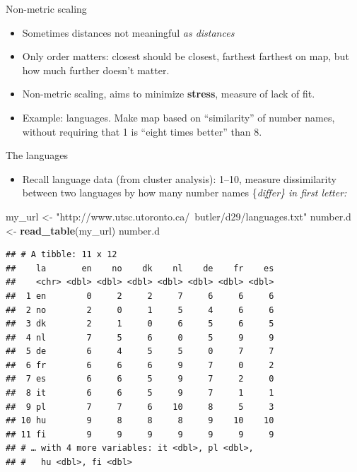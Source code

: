 \documentclass[ignorenonframetext,]{beamer}
\newenvironment{Shaded}{\begin{snugshade}}{\end{snugshade}}
\newcommand{\KeywordTok}[1]{\textcolor[rgb]{0.13,0.29,0.53}{\textbf{#1}}}
\newcommand{\NormalTok}[1]{#1}
\newcommand{\StringTok}[1]{\textcolor[rgb]{0.31,0.60,0.02}{#1}}
\providecommand{\tightlist}{%
  \setlength{\itemsep}{0pt}\setlength{\parskip}{0pt}}
\begin{document}
\begin{frame}{Non-metric scaling}
\protect\hypertarget{non-metric-scaling}{}

\begin{itemize}
\item
  Sometimes distances not meaningful \emph{as distances}
\item
  Only order matters: closest should be closest, farthest farthest on
  map, but how much further doesn't matter.
\item
  Non-metric scaling, aims to minimize \textbf{stress}, measure of lack
  of fit.
\item
  Example: languages. Make map based on ``similarity'' of number names,
  without requiring that 1 is ``eight times better'' than 8.
\end{itemize}

\end{frame}

\begin{frame}[fragile]{The languages}
\protect\hypertarget{the-languages}{}

\begin{itemize}
\tightlist
\item
  Recall language data (from cluster analysis): 1--10, measure
  dissimilarity between two languages by how many number names
  \{\em differ\} in first letter:
\end{itemize}

\begin{Shaded}
\begin{Highlighting}[]
\NormalTok{my_url <-}\StringTok{ "http://www.utsc.utoronto.ca/~butler/d29/languages.txt"}
\NormalTok{number.d <-}\StringTok{ }\KeywordTok{read_table}\NormalTok{(my_url)}
\NormalTok{number.d}
\end{Highlighting}
\end{Shaded}

\begin{verbatim}
## # A tibble: 11 x 12
##    la       en    no    dk    nl    de    fr    es
##    <chr> <dbl> <dbl> <dbl> <dbl> <dbl> <dbl> <dbl>
##  1 en        0     2     2     7     6     6     6
##  2 no        2     0     1     5     4     6     6
##  3 dk        2     1     0     6     5     6     5
##  4 nl        7     5     6     0     5     9     9
##  5 de        6     4     5     5     0     7     7
##  6 fr        6     6     6     9     7     0     2
##  7 es        6     6     5     9     7     2     0
##  8 it        6     6     5     9     7     1     1
##  9 pl        7     7     6    10     8     5     3
## 10 hu        9     8     8     8     9    10    10
## 11 fi        9     9     9     9     9     9     9
## # … with 4 more variables: it <dbl>, pl <dbl>,
## #   hu <dbl>, fi <dbl>
\end{verbatim}

\end{frame}
\end{document}
